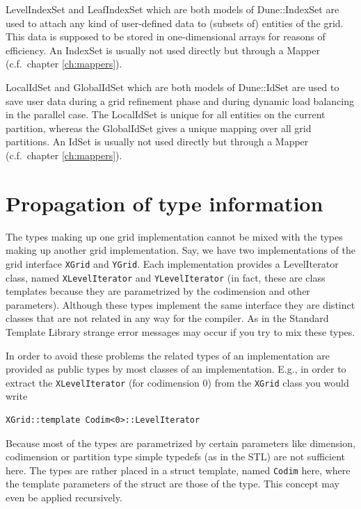 \documentclass[11pt,a4paper,headinclude,footinclude,DIV16,normalheadings]{scrreprt}
\begin{document}

    LevelIndexSet and LeafIndexSet which are both models of
    Dune::IndexSet are used to attach any kind of user-defined data to
    (subsets of) entities of the grid. This data is supposed to be
    stored in one-dimensional arrays for reasons of efficiency. An IndexSet is
    usually not used directly but through a Mapper (c.f.~chapter
    \ref{ch:mappers}).


    LocalIdSet and GlobalIdSet which are both models of Dune::IdSet
    are used to save user data during a grid refinement phase and
    during dynamic load balancing in the parallel case. The LocalIdSet is
    unique for all entities on the current partition, whereas the GlobalIdSet
    gives a unique mapping over all grid partitions. An IdSet is usually not used
    directly but through a Mapper (c.f.~chapter
    \ref{ch:mappers}).


\section{Propagation of type information}

The types making up one grid implementation cannot be mixed with the
types making up another grid implementation. Say, we have two
implementations of the grid interface \lstinline!XGrid! and
\lstinline!YGrid!. Each implementation provides a LevelIterator
class, named \lstinline!XLevelIterator! and
\lstinline!YLevelIterator! (in fact, these are class templates because
they are parametrized by the codimension and other
parameters). Although these types implement the same interface they
are distinct classes that are not related in any way for the
compiler. As in the Standard Template Library strange error messages
may occur if you try to mix these types.

In order to avoid these problems the related types of an
implementation are provided as public types by most classes of an
implementation. E.g., in order to extract the
\lstinline!XLevelIterator! (for codimension 0) from the
\lstinline!XGrid! class you would write
\begin{lstlisting}
XGrid::template Codim<0>::LevelIterator
\end{lstlisting}
Because most of the types are parametrized by certain parameters like
dimension, codimension or partition type simple typedefs (as in the
STL) are not sufficient here. The types are rather placed in a
struct template, named \lstinline!Codim! here, where the template
parameters of the struct are those of the type. This concept may even
be applied recursively. 
\end{document}
